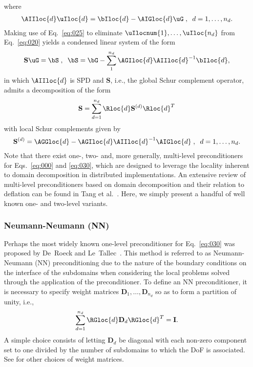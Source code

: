 \documentclass{article}
\begin{document}
where 
\begin{align}\label{eq:025}
\AIIloc{d}\uIloc{d}=\bIloc{d}-\AIGloc{d}\uG
\;,\;\;
d=1,\dots,n_d.
\end{align}
Making use of Eq.~\eqref{eq:025} to eliminate $\uIlocnum{1},\dots,\uIloc{n_d}$ from Eq.~\eqref{eq:020} yields a condensed linear system of the form
\begin{align}\label{eq:030}
\mathbf{S}\uG=\bS
\;,\;\;
\bS=\bG-\sum_{1}^{n_d}\AGIloc{d}\AIIloc{d}^{-1}\bIloc{d},
\end{align}
in which $\AIIloc{d}$ is SPD and $\mathbf{S}$, i.e., the global Schur complement operator, admits a decomposition of the form
\begin{align}
\mathbf{S}=\sum_{d=1}^{n_d}\Rloc{d}\mathbf{S}^{(d)}\Rloc{d}^T
\end{align}
with local Schur complements given by
\begin{align}
\mathbf{S}^{(d)}=
\AGGloc{d}-
\AGIloc{d}\AIIloc{d}^{-1}\AIGloc{d}
\;,\;\;
d=1,\dots,n_d.
\end{align}
Note that there exist one-, two- and, more generally, multi-level preconditioners for Eqs.~\eqref{eq:000} and \eqref{eq:030}, which are designed to leverage the locality inherent to domain decomposition in distributed implementations.
An extensive review of multi-level preconditioners based on domain decomposition and their relation to deflation can be found in Tang et al.~\cite{Tang2009}.
Here, we simply present a handful of well known one- and two-level variants.

\subsubsection{Neumann-Neumann (NN)}
Perhaps the most widely known one-level preconditioner for Eq.~\eqref{eq:030} was proposed by De~Roeck and Le~Tallec~\cite{DeRoeck1991}.
This method is referred to as Neumann-Neumann (NN) preconditioning due to the nature of the boundary conditions on the interface of the subdomains when considering the local problems solved through the application of the preconditioner.
To define an NN preconditioner, it is necessary to specify weight matrices $\mathbf{D}_1,\dots,\mathbf{D}_{n_d}$ so as to form a partition of unity, i.e.,
\begin{align}
\sum_{d=1}^{n_d}
\RGloc{d}
\mathbf{D}_d
\RGloc{d}^T
=\mathbf{I}.
\end{align}
A simple choice consists of letting $\mathbf{D}_d$ be diagonal with each non-zero component set to one divided by the number of subdomains to which the DoF is associated.
See \cite{Toselli} for other choices of weight matrices.
\end{document}

